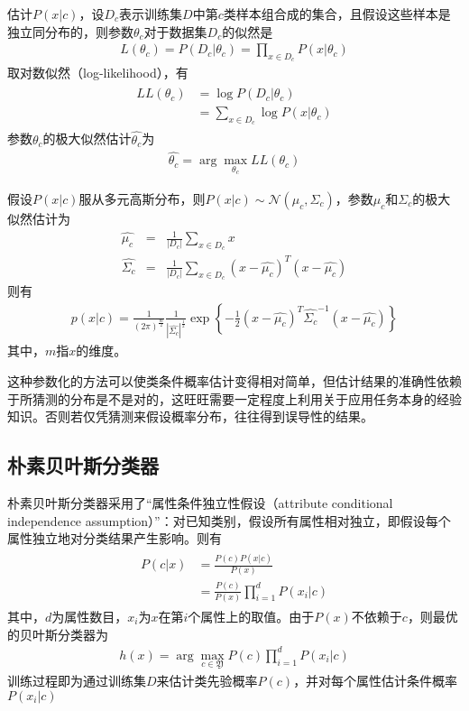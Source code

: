 估计$P(x|c)$，设$D_c$表示训练集$D$中第$c$类样本组合成的集合，且假设这些样本是独立同分布的，则参数$\theta_c$对于数据集$D_c$的似然是
\begin{eqnarray}
L(\theta_c)=P(D_c|\theta_c)=\prod_{x\in D_c}P(x|\theta_c)
\end{eqnarray}
取对数似然（log-likelihood），有
\begin{eqnarray}
\begin{aligned}
LL(\theta_c) &= \log P(D_c|\theta_c)\\
&=\sum_{x\in D_c}\log P(x|\theta_c)
\end{aligned}
\end{eqnarray}
参数$\theta_c$的极大似然估计$\hat{\theta_c}$为
\begin{eqnarray}
\hat{\theta_c}=\arg\max_{\theta_c}LL(\theta_c)
\end{eqnarray}

假设$P(x|c)$服从多元高斯分布，则$P(x|c)\sim \mathcal{N}(\mu_c,\Sigma_c)$，参数$\mu_c$和$\Sigma_c$的极大似然估计为
\begin{eqnarray}
\hat{\mu_c}&=&\frac{1}{|D_c|}\sum_{x\in D_c}x\\
\hat{\Sigma_c}&=&\frac{1}{|D_c|}\sum_{x\in D_c}(x-\hat{\mu_c})^T(x-\hat{\mu_c})
\end{eqnarray}
则有
\begin{eqnarray}
p(x|c)=\frac{1}{(2\pi)^{\frac{m}{2}}}\frac{1}{|\hat{\Sigma_c}|^\frac{1}{2}}\exp
\left\lbrace
-\frac{1}{2}(x-\hat{\mu_c})^T\hat{\Sigma_c}^{-1}(x-\hat{\mu_c})\right\rbrace
\end{eqnarray}
其中，$m$指$x$的维度。

这种参数化的方法可以使类条件概率估计变得相对简单，但估计结果的准确性依赖于所猜测的分布是不是对的，这旺旺需要一定程度上利用关于应用任务本身的经验知识。否则若仅凭猜测来假设概率分布，往往得到误导性的结果。

\subsection{朴素贝叶斯分类器}
朴素贝叶斯分类器采用了“属性条件独立性假设（attribute conditional independence assumption）”：对已知类别，假设所有属性相对独立，即假设每个属性独立地对分类结果产生影响。则有
\begin{eqnarray}
\begin{aligned}
P(c|x)&=\frac{P(c)P(x|c)}{P(x)}\\
&=\frac{P(c)}{P(x)}\prod_{i=1}^dP(x_i|c)
\end{aligned}
\end{eqnarray}
其中，$d$为属性数目，$x_i$为$x$在第$i$个属性上的取值。由于$P(x)$不依赖于$c$，则最优的贝叶斯分类器为
\begin{eqnarray}
h(x)=\arg\max_{c\in\mathfrak{Y}}P(c)\prod_{i=1}^dP(x_i|c)
\end{eqnarray}
训练过程即为通过训练集$D$来估计类先验概率$P(c)$，并对每个属性估计条件概率$P(x_i|c)$

